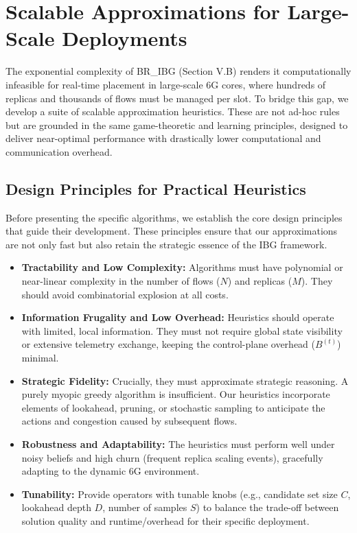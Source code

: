 \documentclass[journal]{IEEEtran}
\theoremstyle{plain}
\theoremstyle{definition}
\theoremstyle{remark}
\begin{document}
\section{Scalable Approximations for Large-Scale Deployments}
\label{sec:approximations}

The exponential complexity of \textsf{BR\_IBG} (Section V.B) renders it computationally infeasible for real-time placement in large-scale 6G cores, where hundreds of replicas and thousands of flows must be managed per slot. To bridge this gap, we develop a suite of scalable approximation heuristics. These are not ad-hoc rules but are grounded in the same game-theoretic and learning principles, designed to deliver near-optimal performance with drastically lower computational and communication overhead.

\subsection{Design Principles for Practical Heuristics}
\label{sec:approx_principles}

Before presenting the specific algorithms, we establish the core design principles that guide their development. These principles ensure that our approximations are not only fast but also retain the strategic essence of the IBG framework.

\begin{itemize}
    \item \textbf{Tractability and Low Complexity:} Algorithms must have polynomial or near-linear complexity in the number of flows ($N$) and replicas ($M$). They should avoid combinatorial explosion at all costs.
    
    \item \textbf{Information Frugality and Low Overhead:} Heuristics should operate with limited, local information. They must not require global state visibility or extensive telemetry exchange, keeping the control-plane overhead ($B^{(t)}$) minimal.
    
    \item \textbf{Strategic Fidelity:} Crucially, they must approximate strategic reasoning. A purely myopic greedy algorithm is insufficient. Our heuristics incorporate elements of lookahead, pruning, or stochastic sampling to anticipate the actions and congestion caused by subsequent flows.
    
    \item \textbf{Robustness and Adaptability:} The heuristics must perform well under noisy beliefs and high churn (frequent replica scaling events), gracefully adapting to the dynamic 6G environment.
    
    \item \textbf{Tunability:} Provide operators with tunable knobs (e.g., candidate set size $C$, lookahead depth $D$, number of samples $S$) to balance the trade-off between solution quality and runtime/overhead for their specific deployment.
\end{itemize}
\end{document}
